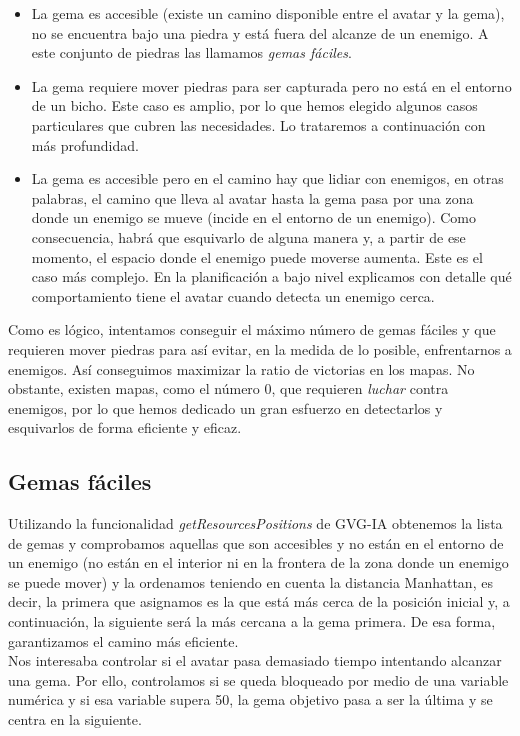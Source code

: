 \begin{itemize}
	\item La gema es accesible (existe un camino disponible entre el avatar y la gema), no se encuentra bajo una piedra y está fuera del alcanze de un enemigo. A este conjunto de piedras las llamamos \textit{gemas fáciles}.
	\item La gema requiere mover piedras para ser capturada pero no está en el entorno de un bicho. Este caso es amplio, por lo que hemos elegido algunos casos particulares que cubren las necesidades. Lo trataremos a continuación con más profundidad.
	\item La gema es accesible pero en el camino hay que lidiar con enemigos, en otras palabras, el camino que lleva al avatar hasta la gema pasa por una zona donde un enemigo se mueve (incide en el entorno de un enemigo). Como consecuencia, habrá que esquivarlo de alguna manera y, a partir de ese momento, el espacio donde el enemigo puede moverse aumenta. Este es el caso más complejo. En la planificación a bajo nivel explicamos con detalle qué comportamiento tiene el avatar cuando detecta un enemigo cerca.
\end{itemize} 

Como es lógico, intentamos conseguir el máximo número de gemas fáciles y que requieren mover piedras para así evitar, en la medida de lo posible, enfrentarnos a enemigos. Así conseguimos maximizar la ratio de victorias en los mapas. No obstante, existen mapas, como el número 0, que requieren \textit{luchar} contra enemigos, por lo que hemos dedicado un gran esfuerzo en detectarlos y esquivarlos de forma eficiente y eficaz.

\subsection{Gemas fáciles}

Utilizando la funcionalidad \textit{getResourcesPositions} de GVG-IA obtenemos la lista de gemas y comprobamos aquellas que son accesibles y no están en el entorno de un enemigo (no están en el interior ni en la frontera de la zona donde un enemigo se puede mover) y la ordenamos teniendo en cuenta la distancia Manhattan, es decir, la primera que asignamos es la que está más cerca de la posición inicial y, a continuación, la siguiente será la más cercana a la gema primera. De esa forma, garantizamos el camino más eficiente. \\

Nos interesaba controlar si el avatar pasa demasiado tiempo intentando alcanzar una gema. Por ello, controlamos si se queda bloqueado por medio de una variable numérica y si esa variable supera 50, la gema objetivo pasa a ser la última y se centra en la siguiente.

